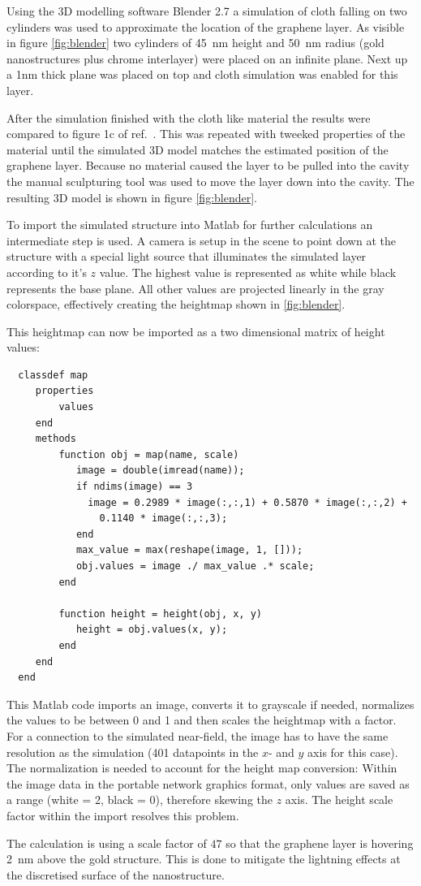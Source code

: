 Using the 3D modelling software Blender 2.7 a simulation of cloth falling on two cylinders was used to approximate the location of the graphene layer. As visible in figure \ref{fig:blender} two cylinders of \SI{45}{nm} height and \SI{50}{nm} radius (gold nanostructures plus chrome interlayer) were placed on an infinite plane. Next up a 1nm thick plane was placed on top and cloth simulation was enabled for this layer.

After the simulation finished with the cloth like material the results were compared to figure 1c of ref.~\cite{heeg}. This was repeated with tweeked properties of the material until the simulated 3D model matches the estimated position of the graphene layer. Because no material caused the layer to be pulled into the cavity the manual sculpturing tool was used to move the layer down into the cavity. The resulting 3D model is shown in figure \ref{fig:blender}.

To import the simulated structure into Matlab for further calculations an intermediate step is used. A camera is setup in the scene to point down at the structure with a special light source that illuminates the simulated layer according to it's $z$ value. The highest value is represented as white while black represents the base plane. All other values are projected linearly in the gray colorspace, effectively creating the heightmap shown in \ref{fig:blender}.

This heightmap can now be imported as a two dimensional matrix of height values:
\begin{verbatim}
  classdef map
     properties
         values
     end
     methods
         function obj = map(name, scale)
            image = double(imread(name));
            if ndims(image) == 3
              image = 0.2989 * image(:,:,1) + 0.5870 * image(:,:,2) +
                0.1140 * image(:,:,3);
            end
            max_value = max(reshape(image, 1, []));
            obj.values = image ./ max_value .* scale;
         end

         function height = height(obj, x, y)
            height = obj.values(x, y);
         end
     end
  end
\end{verbatim}

This Matlab code imports an image, converts it to grayscale if needed, normalizes the values to be between 0 and 1 and then scales the heightmap with a factor. For a connection to the simulated near-field, the image has to have the same resolution as the simulation (401 datapoints in the $x$- and $y$ axis for this case). The normalization is needed to account for the height map conversion: Within the image data in the portable network graphics format, only values are saved as a range (white = 2, black = 0), therefore skewing the $z$ axis. The height scale factor within the import resolves this problem.

The calculation is using a scale factor of $47$ so that the graphene layer is hovering \SI{2}{nm} above the gold structure. This is done to mitigate the lightning effects at the discretised surface of the nanostructure.
